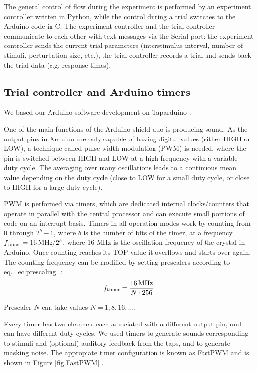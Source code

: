 \documentclass[twocolumn]{article}
\begin{document}
The general control of flow during the experiment is performed by an experiment controller written in Python, while the control during a trial switches to the Arduino code in C. The experiment controller and the trial controller communicate to each other with text messages via the Serial port: the experiment controller sends the current trial parameters (interstimulus interval, number of stimuli, perturbation size, etc.), the trial controller records a trial and sends back the trial data (e.g. response times).



\subsection{Trial controller and Arduino timers}
\label{sec.timers}

We based our Arduino software development on Taparduino \cite{Schultz2016}.

One of the main functions of the Arduino-shield duo is producing sound. As the output pins in Arduino are only capable of having digital values (either HIGH or LOW), a technique called pulse width modulation (PWM) is needed, where the pin is switched between HIGH and LOW at a high frequency with a variable duty cycle. The averaging over many oscillations leads to a continuous mean value depending on the duty cycle (close to LOW for a small duty cycle, or close to HIGH for a large duty cycle).

PWM is performed via timers, which are dedicated internal clocks/counters that operate in parallel with the central processor and can execute small portions of code on an interrupt basis. Timers in all operation modes work by counting from 0 through $2^b-1$, where $b$ is the number of bits of the timer, at a frequency $f_{\mbox{\scriptsize timer}} = 16\,\mbox{MHz}/2^b$, where 16 MHz is the oscillation frequency of the crystal in Arduino. Once counting reaches its TOP value it overflows and starts over again. The counting frequency can be modified by setting prescalers according to eq.\ \ref{ec.prescaling} \cite{arduinomanual}:
\begin{equation}
    f_{\mbox{\scriptsize timer}} = \frac{16\,\mbox{MHz}}{N \cdot 256}
    \label{ec.prescaling}
\end{equation}

\noindent Prescaler $N$ can take values $N=1,8,16,\dots$.

Every timer has two channels each associated with a different output pin, and can have different duty cycles. We used timers to generate sounds corresponding to stimuli and (optional) auditory feedback from the taps, and to generate masking noise. The appropiate timer configuration is known as FastPWM and is shown in Figure \ref{fig.FastPWM} \cite{TimersOVF}.
\end{document}
